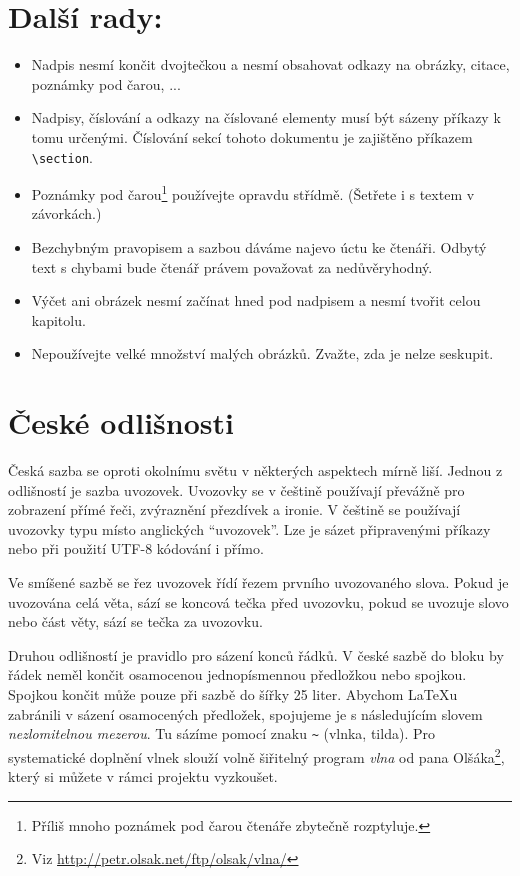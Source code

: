 \documentclass[a4paper, 10pt, twocolumn]{article}
\begin{document}
\section{Další rady:}
\label{section 3}
\begin{itemize}
    \item Nadpis nesmí končit dvojtečkou a nesmí obsahovat odkazy na obrázky, citace, poznámky pod čarou, ... 
    
    \item Nadpisy, číslování a odkazy na číslované elementy musí být sázeny příkazy k tomu určenými. Číslování sekcí tohoto dokumentu je zajištěno příkazem \verb|\section|.
    
    \item Poznámky pod čarou\footnote{Příliš mnoho poznámek pod čarou čtenáře zbytečně rozptyluje.} používejte opravdu střídmě. (Šetřete i s textem v závorkách.)
    
    \item Bezchybným pravopisem a sazbou dáváme najevo úctu ke čtenáři. Odbytý text s chybami bude čtenář právem považovat za nedůvěryhodný.
    
    \item Výčet ani obrázek nesmí začínat hned pod nadpisem a nesmí tvořit celou kapitolu.
    
    \item Nepoužívejte velké množství malých obrázků. Zvažte, zda je nelze seskupit.
\end{itemize}

\section{České odlišnosti}
\label{section 4}
Česká sazba se oproti okolnímu světu v některých aspektech mírně liší.
Jednou z odlišností je sazba uvozovek.
Uvozovky se v češtině používají převážně pro zobrazení přímé řeči, zvýraznění přezdívek a ironie.
V češtině se používají uvozovky typu  místo anglických ``uvozovek''.
Lze je sázet připravenými příkazy nebo při použití UTF-8 kódování i přímo.

Ve smíšené sazbě se řez uvozovek řídí řezem prvního uvozovaného slova.
Pokud je uvozována celá věta, sází se koncová tečka před uvozovku, pokud se uvozuje slovo nebo část věty, sází se tečka za uvozovku.

Druhou odlišností je pravidlo pro sázení konců řádků.
V české sazbě do bloku by řádek neměl končit osamocenou jednopísmennou předložkou nebo spojkou.
Spojkou  končit může pouze při sazbě do šířky 25 liter.
Abychom \LaTeX u zabránili v sázení osamocených předložek, spojujeme je s následujícím slovem \textit{nezlomitelnou mezerou}.
Tu sázíme pomocí znaku \verb|~| (vlnka, tilda).
Pro systematické doplnění vlnek slouží volně šiřitelný program \textit{vlna} od pana Olšáka\footnote{Viz \url{http://petr.olsak.net/ftp/olsak/vlna/}}, který si můžete v rámci projektu vyzkoušet.
\end{document}
